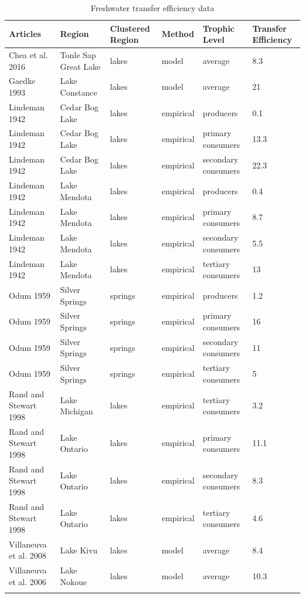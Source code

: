 \documentclass[oneside,12pt,final]{sty/ucthesis-CA2012}
\begin{document}
\begin{mainmatter}
\begin{longtable} {lp{3cm}p{2cm}lp{2cm}p{2cm}} 
	\toprule
    Articles & Region & Clustered Region & Method & Trophic Level & Transfer Efficiency \\
    \midrule
    Chea et al. 2016   & Tonle Sap Great Lake & lakes & model & average & 8.3 \\
    Gaedke 1993   & Lake Constance & lakes & model & average & 21 \\
    Lindeman 1942   & Cedar Bog Lake & lakes & empirical & producers & 0.1 \\
    Lindeman 1942   & Cedar Bog Lake & lakes & empirical & primary consumers & 13.3 \\
    Lindeman 1942   & Cedar Bog Lake & lakes & empirical & secondary consumers & 22.3 \\
    Lindeman 1942   & Lake Mendota & lakes & empirical & producers & 0.4 \\
    Lindeman 1942   & Lake Mendota & lakes & empirical & primary consumers & 8.7 \\
    Lindeman 1942   & Lake Mendota & lakes & empirical & secondary consumers & 5.5 \\
    Lindeman 1942   & Lake Mendota & lakes & empirical & tertiary consumers & 13 \\
    Odum 1959   & Silver Springs & springs & empirical & producers & 1.2 \\
    Odum 1959   & Silver Springs & springs & empirical & primary consumers & 16 \\
    Odum 1959   & Silver Springs & springs & empirical & secondary consumers & 11 \\
    Odum 1959   & Silver Springs & springs & empirical & tertiary consumers & 5 \\
    Rand and Stewart 1998   & Lake Michigan & lakes & empirical & tertiary consumers & 3.2 \\
    Rand and Stewart 1998   & Lake Ontario & lakes & empirical & primary consumers & 11.1 \\
    Rand and Stewart 1998   & Lake Ontario & lakes & empirical & secondary consumers & 8.3 \\
    Rand and Stewart 1998   & Lake Ontario & lakes & empirical & tertiary consumers & 4.6 \\
    Villaneuva et al. 2008   & Lake Kivu & lakes & model & average & 8.4 \\
    Villaneuva et al. 2006   & Lake Nokoue & lakes & model & average & 10.3 \\
    \bottomrule
    \caption{Freshwater transfer efficiency data}
         \label{datafresh}
    \end{longtable}


\end{mainmatter}
\end{document}
